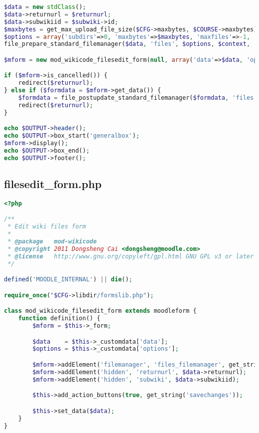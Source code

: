 \begin{lstlisting}[language=PHP]
$data = new stdClass();
$data->returnurl = $returnurl;
$data->subwikiid = $subwiki->id;
$maxbytes = get_max_upload_file_size($CFG->maxbytes, $COURSE->maxbytes);
$options = array('subdirs'=>0, 'maxbytes'=>$maxbytes, 'maxfiles'=>-1, 'accepted_types'=>'*', 'return_types'=>FILE_INTERNAL);
file_prepare_standard_filemanager($data, 'files', $options, $context, 'mod_wiki', 'attachments', $subwiki->id);

$mform = new mod_wikicode_filesedit_form(null, array('data'=>$data, 'options'=>$options));

if ($mform->is_cancelled()) {
    redirect($returnurl);
} else if ($formdata = $mform->get_data()) {
    $formdata = file_postupdate_standard_filemanager($formdata, 'files', $options, $context, 'mod_wikicode', 'attachments', $subwiki->id);
    redirect($returnurl);
}

echo $OUTPUT->header();
echo $OUTPUT->box_start('generalbox');
$mform->display();
echo $OUTPUT->box_end();
echo $OUTPUT->footer();
\end{lstlisting}

\subsection{filesedit\_form.php}
\begin{lstlisting}[language=PHP]
<?php

/**
 * Edit wiki files form
 *
 * @package   mod-wikicode
 * @copyright 2011 Dongsheng Cai <dongsheng@moodle.com>
 * @license   http://www.gnu.org/copyleft/gpl.html GNU GPL v3 or later
 */

defined('MOODLE_INTERNAL') || die();

require_once("$CFG->libdir/formslib.php");

class mod_wikicode_filesedit_form extends moodleform {
    function definition() {
        $mform = $this->_form;

        $data    = $this->_customdata['data'];
        $options = $this->_customdata['options'];

        $mform->addElement('filemanager', 'files_filemanager', get_string('files'), null, $options);
        $mform->addElement('hidden', 'returnurl', $data->returnurl);
        $mform->addElement('hidden', 'subwiki', $data->subwikiid);

        $this->add_action_buttons(true, get_string('savechanges'));

        $this->set_data($data);
    }
}
\end{lstlisting}

